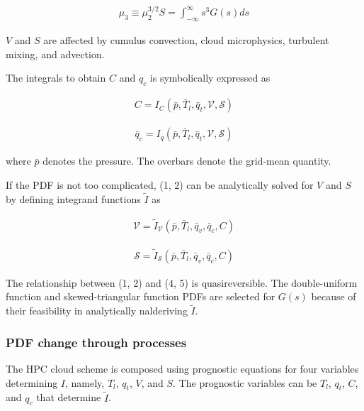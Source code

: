 \begin{eqnarray}
\mu_{3} \equiv \mu_{2}^{3 / 2} S=\int_{-\infty}^{\infty} s^{3} G(s) d s
\end{eqnarray}

\(V\) and \(S\) are affected by cumulus convection, cloud microphysics,
turbulent mixing, and advection.

The integrals to obtain \(C\) and \(q_c\) is symbolically expressed as

\begin{eqnarray}
C=I_{C}\left(\bar{p}, \bar{T}_{l}, \bar{q}_{t}, \mathcal{V}, \mathcal{S}\right)
\label{W09-1}
\end{eqnarray}

\begin{eqnarray}
\bar{q}_{c}=I_{q}\left(\bar{p}, \bar{T}_{l}, \bar{q}_{t}, \mathcal{V}, \mathcal{S}\right)
\label{W09-2}
\end{eqnarray}

where \(\bar{p}\) denotes the pressure. The overbars denote the
grid-mean quantity.

If the PDF is not too complicated, (1, 2) can be analytically solved for
\(V\) and \(S\) by defining integrand functions \({\tilde{I}}\) as

\begin{eqnarray}
\mathcal{V}=\tilde{I}_{\mathcal{V}} \left(\bar{p}, \bar{T}_{l}, \bar{{q}}_{v}, \bar{q}_{c}, C\right)
\label{W09-4}
\end{eqnarray}

\begin{eqnarray}
\mathcal{S}=\tilde{I}_{\mathcal{S}} \left(\bar{p}, \bar{T}_{l}, \bar{{q}}_{v}, \bar{q}_{c}, C\right)
\label{W09-5}
\end{eqnarray}

The relationship between (1, 2) and (4, 5) is quasireversible. The
double-uniform function and skewed-triangular function PDFs are selected
for \(G(s)\) because of their feasibility in analytically nalderiving
\({\tilde{I}}\).

\hypertarget{pdf-change-through-processes}{%
\subsubsection{PDF change through
processes}\label{pdf-change-through-processes}}

The HPC cloud scheme is composed using prognostic equations for four
variables determining \(I\), namely, \(T_l\), \(q_t\), \(V\), and \(S\).
The prognostic variables can be \(T_l\), \(q_t\), \(C\), and \(q_c\)
that determine \(\tilde {I}\).

